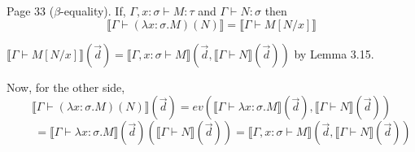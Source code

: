 \begin{problem}{Page 33}
    ($\beta$-equality). If, $\Gamma, x:\sigma \vdash M:\tau$ and $ \Gamma \vdash N:\sigma$ then
$$ \llbracket \Gamma \vdash (\lambda x:\sigma . M)(N) \rrbracket = \llbracket \Gamma \vdash M[N/x] \rrbracket $$
\end{problem}

\begin{solution}
    $ \llbracket \Gamma \vdash M[N/x] \rrbracket (\vec{d}) = \llbracket \Gamma , x: \sigma \vdash M \rrbracket (\vec{d}, \llbracket \Gamma \vdash N \rrbracket (\vec{d})) $ by Lemma 3.15.

Now, for the other side, 
$$  \llbracket \Gamma \vdash (\lambda x : \sigma . M)(N) \rrbracket (\vec{d}) = ev(\llbracket \Gamma \vdash \lambda x:\sigma . M \rrbracket (\vec{d}), \llbracket \Gamma \vdash N \rrbracket (\vec{d}))  $$
$$ \qquad = \llbracket \Gamma \vdash \lambda x:\sigma . M \rrbracket (\vec{d})(\llbracket \Gamma \vdash N \rrbracket (\vec{d})) = \llbracket \Gamma , x:\sigma \vdash M \rrbracket ( \vec{d} , \llbracket \Gamma \vdash N \rrbracket (\vec{d})) $$

\end{solution}